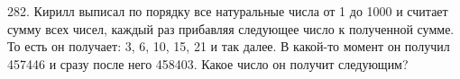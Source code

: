282. Кирилл выписал по порядку все натуральные числа от 1 до 1000 и считает сумму всех чисел, каждый раз прибавляя следующее число к полученной сумме. То есть он получает: 3, 6, 10, 15, 21 и так далее. В какой-то момент он получил 457446 и сразу после него 458403. Какое число он получит следующим?\\
